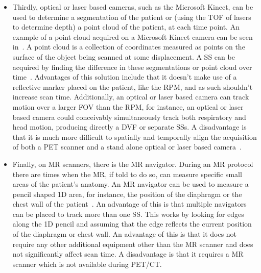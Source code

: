\begin{itemize}
                    \item Thirdly, optical or laser based cameras, such as the Microsoft Kinect, can be used to determine a segmentation of the patient or (using the \gls{TOF} of lasers to determine depth) a point cloud of the patient, at each time point. An example of a point cloud acquired on a Microsoft Kinect camera can be seen in~. A point cloud is a collection of coordinates measured as points on the surface of the object being scanned at some displacement. A \gls{SS} can be acquired by finding the difference in these segmentations or point cloud over time~\parencite{Miranda2017MarkerlessAnimals}. Advantages of this solution include that it doesn't make use of a reflective marker placed on the patient, like the \gls{RPM}, and as such shouldn't increase scan time. Additionally, an optical or laser based camera can track motion over a larger \gls{FOV} than the \gls{RPM}, for instance, an optical or laser based camera could conceivably simultaneously track both respiratory and head motion, producing directly a \gls{DVF} or separate \glspl{SS}. A disadvantage is that it is much more difficult to spatially and temporally align the acquisition of both a \gls{PET} scanner and a stand alone optical or laser based camera~\parencite{Noonan2012AccurateKinect, Noonan2015RepurposingPET, Whitehead2018MotionPET/CT}.
                    
                    \item Finally, on \gls{MR} scanners, there is the \gls{MR} navigator. During an \gls{MR} protocol there are times when the \gls{MR}, if told to do so, can measure specific small areas of the patient's anatomy. An \gls{MR} navigator can be used to measure a pencil shaped \gls{1D} area, for instance, the position of the diaphragm or the chest wall of the patient~\parencite{Taylor1997MRAngiography}. An advantage of this is that multiple navigators can be placed to track more than one \gls{SS}. This works by looking for edges along the \gls{1D} pencil and assuming that the edge reflects the current position of the diaphragm or chest wall. An advantage of this is that it does not require any other additional equipment other than the \gls{MR} scanner and does not significantly affect scan time. A disadvantage is that it requires a \gls{MR} scanner which is not available during \gls{PET}/\gls{CT}.
                \end{itemize}
                
